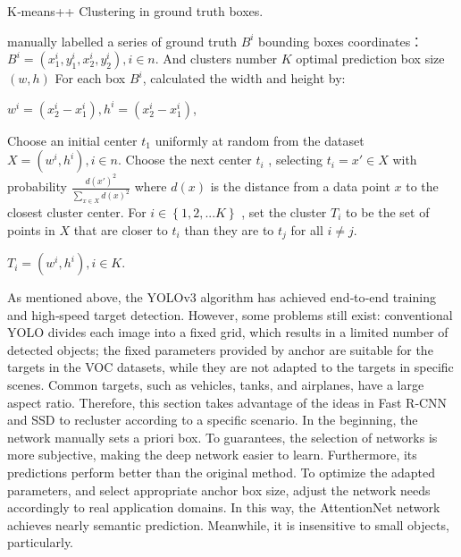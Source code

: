 \begin{algorithm}[h]
  \caption{K‐means++ Clustering in ground truth boxes.}
  \label{alg:Framwork}
  \begin{algorithmic}[1]
    \Require
    manually labelled a series of ground truth $B^{i}$ bounding boxes coordinates：
     $B^{i}=\left ( x_{1}^{i},y_{1}^{i},x_{2}^{i},y_{2}^{i} \right ), i\in n.$ And clusters number $K$
    \Ensure
    optimal  prediction box size $\left ( w,h \right )$
    \State For each box $B^{i}$, calculated the width and height by:
    
    $w^{i}=(x_{2}^{i}-x_{1}^{i}), h^{i}=(x_{2}^{i}-x_{1}^{i})$, 
    
    \State Choose an initial center $t_{1}$ uniformly at random from the dataset $X=(w^{i},h^{i}),i\in n$.
       \State Choose the next center $t_{i}$ , selecting $t_{i}={x}'\in X $ with probability $\frac{d ( {x}')^{2}}{\sum_{x\in X}^{}d\left ( x \right )^{2} }$
where $d\left ( x \right )$ is the distance from a data point $x$ to the closest cluster center.
       \State For $i \in \left \{ 1,2,...K \right \}$ , set the cluster $T_{i}$ to be the set of points in $X$ that are closer to
$t_{i}$ than they are to $t_{j}$ for all $i\neq j$.
    
  
    \Return $T_{i}=(w^{i},h^{i}),i \in K$.
  \end{algorithmic}
\end{algorithm}

As mentioned above, the YOLOv3 algorithm has achieved end‐to‐end training and high‐speed target detection. However, some problems still exist: conventional YOLO divides each image into a fixed grid, which results in a limited number of detected objects;  the fixed parameters provided by anchor are suitable for the targets in the VOC datasets, while they are not adapted to the targets in specific scenes. Common targets, such as vehicles, tanks, and airplanes, have a large aspect ratio. Therefore, this section takes advantage of the ideas in Fast R‐CNN and SSD to recluster according to a specific scenario. In the beginning, the network manually sets a priori box. To guarantees, the selection of networks is more subjective, making the deep network easier to learn.
Furthermore, its predictions perform better than the original method. To optimize the adapted parameters, and select appropriate anchor box size, adjust the network needs accordingly to real application domains. In this way, the AttentionNet network achieves nearly semantic prediction. Meanwhile, it is insensitive to small objects, particularly.




